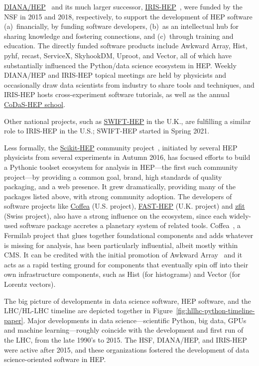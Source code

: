 \documentclass[12pt,a4paper]{article}
\begin{document}
\href{http://diana-hep.org/}{DIANA/HEP}~\cite{DIANA/HEP} and its much larger successor, \href{https://iris-hep.org/}{IRIS-HEP}~\cite{IRIS-HEP}, were funded by the NSF in 2015 and 2018, respectively, to support the development of HEP software (a)~financially, by funding software developers, (b)~as an intellectual hub for sharing knowledge and fostering connections, and (c)~through training and education. The directly funded software products include Awkward Array, Hist, pyhf, recast, ServiceX, SkyhookDM, Uproot, and Vector, all of which have substantially influenced the Python/data science ecosystem in HEP. Weekly DIANA/HEP and IRIS-HEP topical meetings are held by physicists and occasionally draw data scientists from industry to share tools and techniques, and IRIS-HEP hosts cross-experiment software tutorials, as well as the annual \href{http://codas-hep.org/}{CoDaS-HEP school}.

Other national projects, such as \href{https://gtr.ukri.org/projects?ref=ST\%2FV002562\%2F1}{SWIFT-HEP} in the U.K., are fulfilling a similar role to IRIS-HEP in the U.S.;
SWIFT-HEP started in Spring 2021.

Less formally, the \href{https://scikit-hep.org/}{Scikit-HEP} community project~\cite{Rodrigues:2020syo}, initiated  by several HEP physicists from several experiments in Autumn 2016, has focused efforts to build a Pythonic toolset ecosystem for analysis in HEP---the first such community project---by providing a common goal, brand, high standards of quality packaging, and a web presence. It grew dramatically, providing many of the packages listed above, with strong community adoption. The developers of software projects like \href{https://coffeateam.github.io/coffea/}{Coffea} (U.S. project), \href{https://fast-hep.web.cern.ch/fast-hep/}{FAST-HEP} (U.K. project) and \href{https://zfit.readthedocs.io/en/latest/}{zfit} (Swiss project), also have a strong influence on the ecosystem, since each widely-used software package accretes a planetary system of related tools. Coffea~\cite{Smith:2020pxs}, a Fermilab project that glues together foundational components and adds whatever is missing for analysis, has been particularly influential,
albeit mostly within CMS. It can be credited with the initial promotion of Awkward Array~\cite{Pivarski:2020txo} and it acts as a rapid testing ground for components that eventually spin off into their own infrastructure components, such as Hist (for histograms) and Vector (for Lorentz vectors).

The big picture of developments in data science software, HEP software, and the LHC/HL-LHC timeline are depicted together in Figure~\ref{fig:hllhc-python-timeline-paper}. Major developments in data science---scientific Python, big data, GPUs and machine learning---roughly coincide with the development and first run of the LHC, from the late 1990's to 2015. The HSF, DIANA/HEP, and IRIS-HEP were active after 2015, and these organizations fostered the development of data science-oriented software in HEP.
\end{document}
